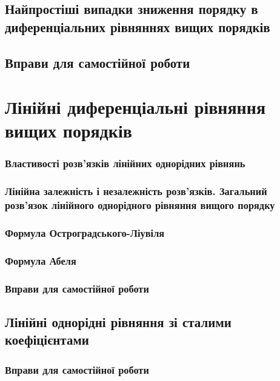 \documentclass[a4paper, 12pt]{article}
\theoremstyle{definition}
\numberwithin{equation}{section}%
\numberwithin{equation}{subsection}
\begin{document}


\subsection{Найпростіші випадки зниження порядку в диференціальних рівняннях вищих порядків}



\subsection{Вправи для самостійної роботи}



\section{Лінійні диференціальні рівняння вищих порядків}



\subsubsection{Властивості розв’язків лінійних однорідних рівнянь}



\subsubsection{Лінійна залежність і незалежність розв’язків. Загальний розв’язок лінійного однорідного рівняння вищого порядку}



\subsubsection{Формула Остроградського-Ліувіля}



\subsubsection{Формула Абеля}



\subsubsection{Вправи для самостійної роботи}



\subsection{Лінійні однорідні рівняння зі сталими коефіцієнтами}



\subsubsection{Вправи для самостійної роботи}


\end{document}
